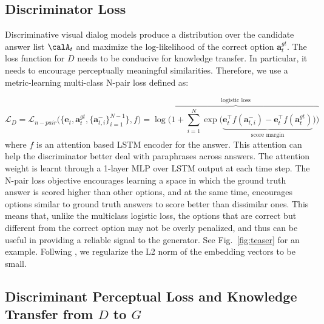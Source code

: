 \documentclass{article}
\begin{document}
\subsection{Discriminator Loss}
\label{sec:discloss}
Discriminative visual dialog models produce a distribution over the candidate answer list $\calA_t$
and maximize the log-likelihood of the correct option $\bm{a}_t^{gt}$. 
The loss function for $D$ needs to be conducive for knowledge transfer. In particular, it needs to encourage 
perceptually meaningful similarities. Therefore, we use a metric-learning multi-class N-pair loss \cite{sohn2016improved} defined as: 

\vspace{-10pt}
\begin{equation}
 \mathcal{L}_{D} =  \mathcal{L}_{n-pair}\Big(\{ \bm{e}_t, \bm{a}^{gt}_t, \{\bm{a}^-_{t, i}\}_{i=1}^{N-1} \}, f\Big) = 
\overbrace{
\log \Bigg(1 + \sum_{i=1}^{N} \exp \Big(  \underbrace{\bm{e}^\top_t f(\bm{a}^-_{t,i}) - \bm{e}^\top_t f(\bm{a}^{gt}_t)}_{\text{score margin}} \Big)
\Bigg)}^{\text{logistic loss}} \label{eq:n-pair}
\end{equation}
where $f$ is an attention based LSTM encoder for the answer. This attention can help the discriminator better deal with paraphrases across answers. The attention weight is learnt through a 1-layer MLP over LSTM output at each time step.
The N-pair loss objective encourages learning a space in which the ground truth answer is scored higher than other options, and at the same time, encourages options similar to ground truth answers to score better than dissimilar ones.  
This  means that, unlike the multiclass logistic loss, the options that are correct but 
different from the correct option may not be overly penalized, and thus can be useful in providing a reliable signal to the generator.  See Fig.~\ref{fig:teaser} for an example. 
Follwing \cite{sohn2016improved}, we regularize the L2 norm of the embedding vectors to be small.


\subsection{Discriminant Perceptual Loss and Knowledge Transfer from $D$ to $G$} 
\label{sec:transfer}
\end{document}

